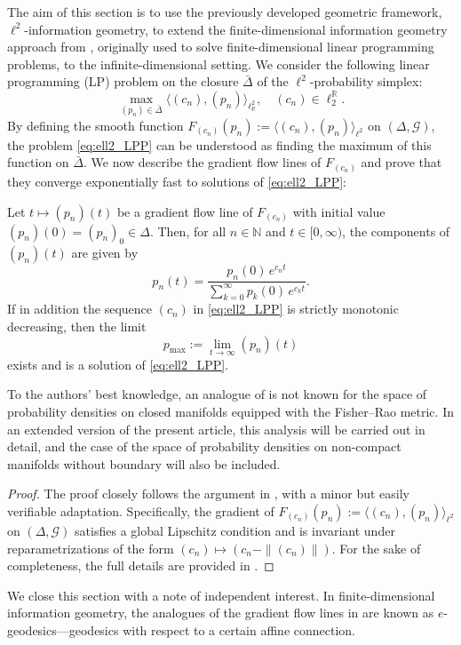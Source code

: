 \documentclass[runningheads]{llncs}
\newcommand{\R}{\mathbb{R}}
\begin{document}
The aim of this section is to use the previously developed geometric framework, $\ell^2$-information geometry, to extend the finite-dimensional information geometry approach from \cite{faybusovich_hamiltonian_1991}, originally used to solve finite-dimensional linear programming problems, to the infinite-dimensional setting. 
We consider the following linear programming (LP) problem on the closure $\bar{\Delta}$ of the $\ell^2$-probability simplex:  
\begin{equation}\tag{LP}\label{eq:ell2_LPP}
	\max_{(p_n)\in \bar{\Delta}} \langle (c_n), (p_n) \rangle_{\ell^2_\R}, \quad (c_n)\in \ell_2^\R.
\end{equation}
By defining the smooth function \( F_{(c_n)}(p_n) := \langle (c_n), (p_n) \rangle_{\ell^2} \) on \( (\Delta, \mathcal{G}) \), the problem \eqref{eq:ell2_LPP} can be understood as finding the maximum of this function on \( \bar{\Delta} \). We now describe the gradient flow lines of \( F_{(c_n)} \) and prove that they converge exponentially fast to solutions of \eqref{eq:ell2_LPP}:

\begin{proposition}
    \label{prop:integral-curves}
Let \( t \mapsto (p_n)(t) \) be a gradient flow line of \( F_{(c_n)} \) with initial value \( (p_n)(0) = (p_n)_0 \in \Delta \). Then, for all \( n \in \mathbb{N} \) and \( t \in [0, \infty) \), the components of \( (p_n)(t) \) are given by
\begin{equation} \label{eq:integral-curves}
	p_n(t) = \frac{p_n(0)\,e^{c_n t}}{\sum_{k=0}^{\infty} p_k(0)\,e^{c_k t}}.
\end{equation}
If in addition the sequence $(c_n)$ in \eqref{eq:ell2_LPP} is strictly monotonic decreasing, then the limit
\[
p_{\max} := \lim_{t \to \infty} (p_n)(t)
\]
exists and is a solution of \eqref{eq:ell2_LPP}.
\end{proposition}
\begin{remark}
  To the authors' best knowledge, an analogue of  is not known for the space of probability densities on closed manifolds equipped with the Fisher–Rao metric. In an extended version of the present article, this analysis will be carried out in detail, and the case of the space of probability densities on non-compact manifolds without boundary will also be included.
\end{remark}
\begin{proof}
The proof closely follows the argument in \cite[p.~2]{faybusovich_hamiltonian_1991}, with a minor but easily verifiable adaptation. Specifically, the gradient of \( F_{(c_n)}(p_n) := \langle (c_n), (p_n) \rangle_{\ell^2} \) on \( (\Delta, \mathcal{G}) \) satisfies a global Lipschitz condition and is invariant under reparametrizations of the form \( (c_n) \mapsto (c_n - \| (c_n) \|) \). For the sake of completeness, the full details are provided in .
\end{proof}
We close this section with a note of independent interest. In finite-dimensional information geometry, the analogues of the gradient flow lines in  are known as $e$-geodesics—geodesics with respect to a certain affine connection.
\end{document}
